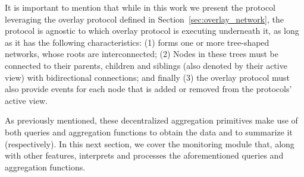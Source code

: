 It is important to mention that while in this work we present the protocol leveraging the overlay protocol defined in Section~\ref{sec:overlay_network}, the protocol is agnostic to which overlay protocol is executing underneath it, as long as it has the following characteristics: (1) forms one or more tree-shaped networks, whose roots are interconnected; (2) Nodes in these trees must be connected to their parents, children and siblings (also denoted by their active view) with bidirectional connections; and finally (3) the overlay protocol must also provide events for each node that is added or removed from the protocols' active view.

% 
As previously mentioned, these decentralized aggregation primitives make use of both queries and aggregation functions to obtain the data and to summarize it (respectively). In this next section, we cover the monitoring module that, along with other features, interprets and processes the aforementioned queries and aggregation functions.